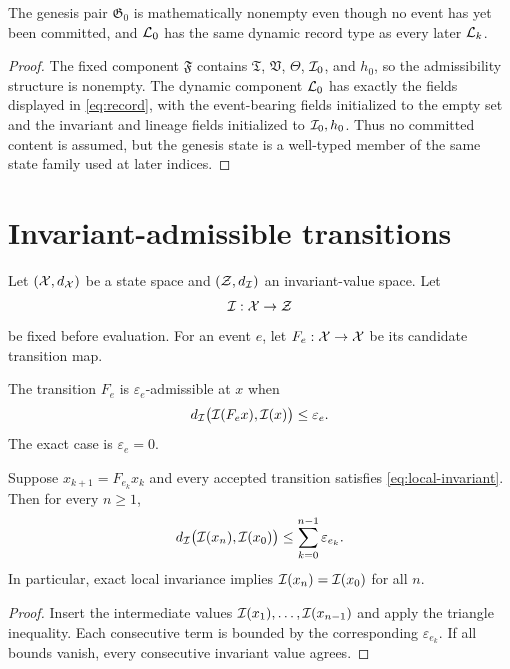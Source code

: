 \begin{theorem}
The genesis pair $\mathfrak G_0$ is mathematically nonempty even though no event has yet been committed, and $\mathcal L_0$ has the same dynamic record type as every later $\mathcal L_k$.
\end{theorem}

\begin{proof}
The fixed component $\mathfrak F$ contains $\mathfrak T$, $\mathfrak V$, $\Theta$, $\mathcal I_0$, and $h_0$, so the admissibility structure is nonempty. The dynamic component $\mathcal L_0$ has exactly the fields displayed in \cref{eq:record}, with the event-bearing fields initialized to the empty set and the invariant and lineage fields initialized to $\mathcal I_0,h_0$. Thus no committed content is assumed, but the genesis state is a well-typed member of the same state family used at later indices.
\end{proof}

\section{Invariant-admissible transitions}

Let $(\mathcal X,d_\mathcal X)$ be a state space and $(\mathcal Z,d_\mathcal I)$ an invariant-value space. Let
\[
\mathcal I:\mathcal X\to\mathcal Z
\]
be fixed before evaluation. For an event $e$, let $F_e:\mathcal X\to\mathcal X$ be its candidate transition map.

\begin{definition}
The transition $F_e$ is $\varepsilon_e$-admissible at $x$ when
\begin{equation}
d_\mathcal I\bigl(\mathcal I(F_ex),\mathcal I(x)\bigr)\le \varepsilon_e.
\label{eq:local-invariant}
\end{equation}
The exact case is $\varepsilon_e=0$.
\end{definition}

\begin{theorem}
Suppose $x_{k+1}=F_{e_k}x_k$ and every accepted transition satisfies \cref{eq:local-invariant}. Then for every $n\ge1$,
\begin{equation}
d_\mathcal I\bigl(\mathcal I(x_n),\mathcal I(x_0)\bigr)
\le \sum_{k=0}^{n-1}\varepsilon_{e_k}.
\label{eq:telescope}
\end{equation}
In particular, exact local invariance implies $\mathcal I(x_n)=\mathcal I(x_0)$ for all $n$.
\end{theorem}

\begin{proof}
Insert the intermediate values $\mathcal I(x_1),\ldots,\mathcal I(x_{n-1})$ and apply the triangle inequality. Each consecutive term is bounded by the corresponding $\varepsilon_{e_k}$. If all bounds vanish, every consecutive invariant value agrees.
\end{proof}
